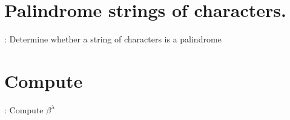 \documentclass[preview]{standalone}
\begin{document}
\section{Palindrome strings of characters.}
\color{lightgray} \begin{algorithm}
    \renewcommand{\thealgorithm}{3109}
    \caption{: Determine whether a string of characters is a palindrome}
    
\end{algorithm} \color{black}
\begin{center}
    
\end{center}
\text{\\}
\begin{center}
    
\end{center}
\pagebreak


\section{Compute \bm{$\beta^\lambda$}}
\color{lightgray} \begin{algorithm}
    \renewcommand{\thealgorithm}{3110}
    \caption{: Compute $\beta^\lambda$}
    
\end{algorithm} \color{black}
\begin{center}
    
\end{center}
\text{\\}
\begin{center}
    
\end{center}
\pagebreak
\end{document}
